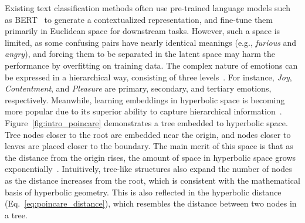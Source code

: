 Existing text classification methods often use pre-trained language models such as
BERT~\cite{devlin-etal-2019-bert} to generate a contextualized representation,
and fine-tune them primarily in Euclidean space for downstream tasks. 
However, such a space is limited, as some confusing pairs have
nearly identical meanings (e.g., \textit{furious} and \textit{angry}), 
and forcing them to be separated in the latent space may harm the performance
by overfitting on training data.
The complex nature of emotions can be expressed in a hierarchical way, consisting of three levels~\cite{parrott2001emotions}.
For instance, \emph{Joy}, \emph{Contentment}, and \emph{Pleasure} are primary, secondary, and tertiary emotions, respectively.
Meanwhile, learning embeddings in hyperbolic space is becoming more popular due to its superior
ability to capture hierarchical information~\cite{NIPS2017_poincare_hierarchical, 
ganea2018hyperbolic,chami2019hyperbolic_gcn,liu2019hyperbolic_gnn}.
Figure~\ref{fig:intro_poincare} demonstrates a tree embedded to hyperbolic
space. Tree nodes closer to the root are embedded near the origin,
and nodes closer to leaves are placed closer to the boundary. The
main merit of this space is that as the distance from the origin rises, the
amount of space in hyperbolic space grows
exponentially~\cite{cho2019large,lopez-strube-2020-fully,2021_hyper_survey}.
Intuitively, tree-like structures also expand the number of nodes as the
distance increases from the root, which is consistent with the mathematical basis
of hyperbolic geometry. This is also reflected in 
the hyperbolic distance (Eq.~\ref{eq:poincare_distance}), %
which resembles
the distance between two nodes in a tree.

